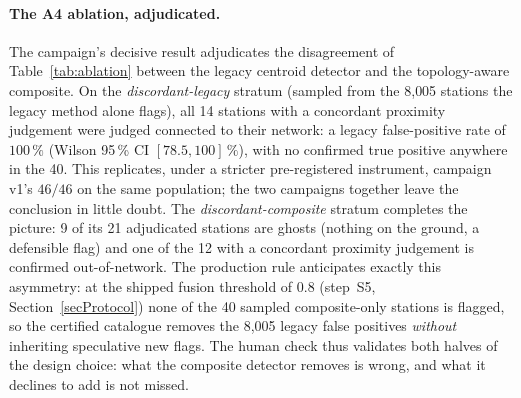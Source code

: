 \documentclass[11pt,a4paper]{article}
\begin{document}
\paragraph{The A4 ablation, adjudicated.}
The campaign's decisive result adjudicates the disagreement of
Table~\ref{tab:ablation} between the legacy centroid detector and the
topology-aware composite. On the \emph{discordant-legacy} stratum
(sampled from the 8{,}005 stations the legacy method alone flags), all 14
stations with a concordant proximity judgement were judged connected to
their network: a legacy false-positive rate of $100\,\%$ (Wilson 95\,\%
CI $[78.5, 100]\,\%$), with no confirmed true positive anywhere in the
40. This replicates, under a stricter pre-registered instrument, campaign
v1's $46/46$ on the same population; the two campaigns together leave the
conclusion in little doubt. The \emph{discordant-composite} stratum
completes the picture: 9 of its 21 adjudicated stations are ghosts
(nothing on the ground, a defensible flag) and one of the 12 with a
concordant proximity judgement is confirmed out-of-network. The
production rule anticipates exactly this asymmetry: at the shipped fusion
threshold of $0.8$ (step~S5, Section~\ref{secProtocol}) none of the 40
sampled composite-only stations is flagged, so the certified catalogue
removes the 8{,}005 legacy false positives \emph{without} inheriting
speculative new flags. The human check thus validates both halves of the
design choice: what the composite detector removes is wrong, and what it
declines to add is not missed.
\end{document}
